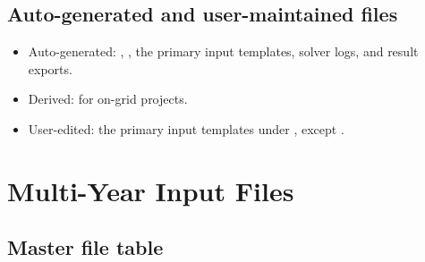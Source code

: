 \documentclass[11pt,a4paper]{report}
\begin{document}
\section{Auto-generated and user-maintained files}

\begin{itemize}[leftmargin=1.5em]
  \item Auto-generated: , , the primary input templates, solver logs, and result exports.
  \item Derived:  for on-grid projects.
  \item User-edited: the primary input templates under , except .
\end{itemize}

\chapter{Multi-Year Input Files}\label{sec:multi-year-inputs}

\section{Master file table}
\end{document}
